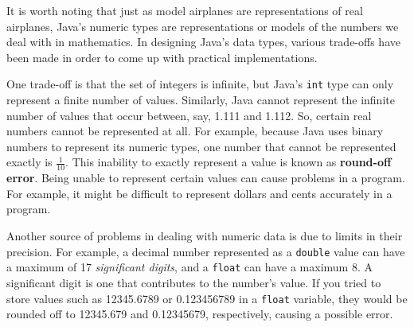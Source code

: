 
It is worth noting that just as model airplanes are representations of
real airplanes, Java's numeric types are representations or
models of the numbers we deal with in mathematics.  In designing
Java's data types, various trade-offs have been made in order to come
up with practical implementations.

One trade-off is that the set of integers is infinite, but Java's
{\tt int} type can only represent a finite number of values.   Similarly,
Java cannot \mbox{represent} the infinite number of values that occur
between, say, 1.111 and 1.112. So, certain real numbers cannot be
represented at all.  For example, because Java uses binary numbers to
represent its numeric types, one number that cannot be represented
exactly is $\frac{1}{10}$. This inability to exactly represent a value
is known as {\bf round-off error}.  Being unable to represent certain
values can cause problems in a program. For example, it might be
difficult to represent dollars and cents accurately in a program.

Another source of problems in dealing with numeric data is due to
limits in their precision. For example, a decimal number represented
as a \mbox{\tt double} value can have a maximum of 17 {\it significant
digits}, and a {\tt float} can have a maximum 8. A significant digit
is one that contributes to the number's value.  If you tried to store
values such as 12345.6789 or 0.123456789 in a {\tt float} variable,
they would be rounded off to 12345.679 and 0.12345679, respectively,
causing a possible error.


\label{self-study-exercises}

